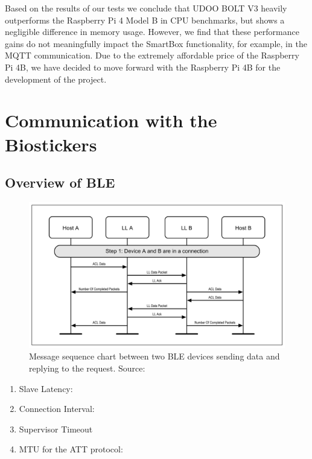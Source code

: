 Based on the results of our tests we conclude that UDOO BOLT V3 heavily outperforms the Raspberry Pi 4 Model B in CPU benchmarks, but shows a negligible difference in memory usage. However, we find that these performance gains do not meaningfully impact the SmartBox functionality, for example, in the \acs{MQTT} communication. Due to the extremely affordable price of the Raspberry Pi 4B, we have decided to move forward with the Raspberry Pi 4B for the development of the project.

\section{Communication with the Biostickers}

\subsection{Overview of \acf{BLE}}

\begin{figure}[H]
    \centering
    \includegraphics[width=\linewidth]{images/ble-sending-data.PNG}
    \caption[Message sequence chart between two \acs{BLE} devices sending data and replying to the request.]{Message sequence chart between two \acs{BLE} devices sending data and replying to the request. Source: \cite{Specification1999}}
    \label{fig:differences-between-cloud-services}
\end{figure}


\begin{enumerate}
    \item Slave Latency:
    \item Connection Interval:
    \item Supervisor Timeout
    \item \acs{MTU} for the \acs{ATT} protocol: 
\end{enumerate}

